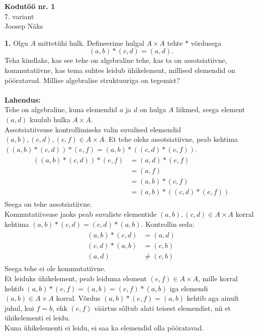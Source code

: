 \documentclass{article}
\begin{document}
\begin{center}
\Large\textbf{Kodutöö nr. 1}\\
7. variant\\
\small{Joosep Näks}
\end{center}
\textbf{1. } Olgu $A$ mittetühi hulk. Defineerime hulgal $A\times A$ tehte $*$ võrdusega
\begin{equation*}
(a,b)*(c,d)=(a,d).
\end{equation*}
Teha kindlaks, kas see tehe on algebraline tehe, kas ta on assotsiatiivne, kommutatiivne, kas tema suhtes leidub ühikelement, millised elemendid on pööratavad. Millise algebralise struktuuriga on tegemist?\\
\\\textbf{Lahendus:}\\
Tehe on algebraline, kuna elemendid $a$ ja $d$ on hulga $A$ liikmed, seega element $(a,d)$ kuulub hulka $A\times A$.\\
Assotsiatiivsuse kontrollimiseks valin suvalised elemendid $(a,b),(c,d),(e,f)\in A\times A$. Et tehe oleks assotsiatiivne, peab kehtima $((a,b)*(c,d))*(e,f)=(a,b)*((c,d)*(e,f))$.
\begin{gather*}
\begin{aligned}
((a,b)*(c,d))*(e,f)&=(a,d)*(e,f)\\
&=(a,f)\\
&=(a,b)*(c,f)\\
&=(a,b)*((c,d)*(e,f))
\end{aligned}
\end{gather*}
Seega on tehe assotsiatiivne.\\
Kommutatiivsuse jaoks peab suvaliste elementide $(a,b),(c,d)\in A\times A$ korral kehtima $(a,b)*(c,d)=(c,d)*(a,b)$. Kontrollin seda:
\begin{gather*}
\begin{aligned}
(a,b)*(c,d)&=(a,d)\\
(c,d)*(a,b)&=(c,b)\\
(a,d)&\neq(c,b)
\end{aligned}
\end{gather*}
Seega tehe ei ole kommutatiivne.\\
Et leiduks ühikelement, peab leiduma element $(e,f)\in A\times A$, mille korral kehtib $(a,b)*(e,f)=(a,b)=(e,f)*(a,b)$ iga elemendi $(a,b)\in A\times A$ korral. Võrdus $(a,b)*(e,f)=(a,b)$ kehtib aga ainult juhul, kui $f=b$, ehk $(e,f)$ väärtus sõltub alati teisest elemendist, nii et ühikelementi ei leidu.\\
Kuna ühikelementi ei leidu, ei saa ka elemendid olla pööratavad.\\
\end{document}
